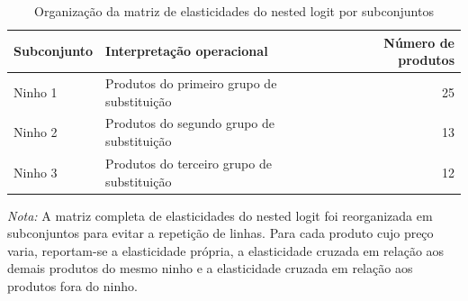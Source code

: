 


\begingroup
\begin{table}[H]
\centering
\caption{Organização da matriz de elasticidades do nested logit por subconjuntos}
\label{tab:elasticity-nested-logit-global}
\small
\begin{tabular}{llr}
\toprule
Subconjunto & Interpretação operacional & Número de produtos \\
\midrule
Ninho 1 & Produtos do primeiro grupo de substituição & 25 \\
Ninho 2 & Produtos do segundo grupo de substituição & 13 \\
Ninho 3 & Produtos do terceiro grupo de substituição & 12 \\
\bottomrule
\end{tabular}

\vspace{0.3em}
\footnotesize
\textit{Nota:} A matriz completa de elasticidades do nested logit foi reorganizada em subconjuntos para evitar a repetição de linhas. Para cada produto cujo preço varia, reportam-se a elasticidade própria, a elasticidade cruzada em relação aos demais produtos do mesmo ninho e a elasticidade cruzada em relação aos produtos fora do ninho.
\end{table}
\endgroup



